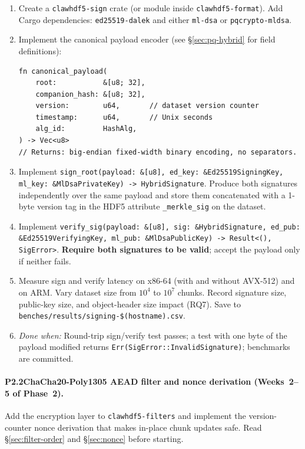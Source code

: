 \documentclass[11pt]{article}
\begin{document}
\begin{enumerate}[nosep]
  \item Create a \texttt{clawhdf5-sign} crate (or module inside
    \texttt{clawhdf5-format}). Add Cargo dependencies:
    \texttt{ed25519-dalek} and either \texttt{ml-dsa} or
    \texttt{pqcrypto-mldsa}.
  \item Implement the canonical payload encoder
    (see \S\ref{sec:pq-hybrid} for field definitions):
\begin{lstlisting}
fn canonical_payload(
    root:           &[u8; 32],
    companion_hash: &[u8; 32],
    version:        u64,       // dataset version counter
    timestamp:      u64,       // Unix seconds
    alg_id:         HashAlg,
) -> Vec<u8>
// Returns: big-endian fixed-width binary encoding, no separators.
\end{lstlisting}
  \item Implement \texttt{sign\_root(payload: \&[u8], ed\_key:
    \&Ed25519SigningKey, ml\_key: \&MlDsaPrivateKey) -> HybridSignature}.
    Produce both signatures independently over the same payload and store
    them concatenated with a 1-byte version tag in the HDF5 attribute
    \texttt{\_merkle\_sig} on the dataset.
  \item Implement \texttt{verify\_sig(payload: \&[u8], sig:
    \&HybridSignature, ed\_pub: \&Ed25519VerifyingKey, ml\_pub:
    \&MlDsaPublicKey) -> Result<(), SigError>}. \textbf{Require both
    signatures to be valid}; accept the payload only if neither fails.
  \item Measure sign and verify latency on x86-64 (with and without
    AVX-512) and on ARM. Vary dataset size from $10^4$ to $10^7$ chunks.
    Record signature size, public-key size, and object-header size impact
    (RQ7). Save to \texttt{benches/results/signing-\$(hostname).csv}.
  \item \emph{Done when:} Round-trip sign/verify test passes; a test with
    one byte of the payload modified returns
    \texttt{Err(SigError::InvalidSignature)}; benchmarks are committed.
\end{enumerate}

\paragraph{P2.2\enspace ChaCha20-Poly1305 AEAD filter and nonce derivation
(Weeks~2--5 of Phase~2).}
Add the encryption layer to \texttt{clawhdf5-filters} and implement the
version-counter nonce derivation that makes in-place chunk updates safe.
Read \S\ref{sec:filter-order} and \S\ref{sec:nonce} before starting.
\end{document}
